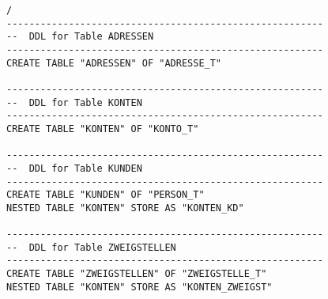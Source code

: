 \documentclass{scrartcl}
\begin{document}
\begin{lstlisting}
/
--------------------------------------------------------
--  DDL for Table ADRESSEN
--------------------------------------------------------
CREATE TABLE "ADRESSEN" OF "ADRESSE_T" 

--------------------------------------------------------
--  DDL for Table KONTEN
--------------------------------------------------------
CREATE TABLE "KONTEN" OF "KONTO_T" 

--------------------------------------------------------
--  DDL for Table KUNDEN
--------------------------------------------------------
CREATE TABLE "KUNDEN" OF "PERSON_T" 
NESTED TABLE "KONTEN" STORE AS "KONTEN_KD"

--------------------------------------------------------
--  DDL for Table ZWEIGSTELLEN
--------------------------------------------------------
CREATE TABLE "ZWEIGSTELLEN" OF "ZWEIGSTELLE_T" 
NESTED TABLE "KONTEN" STORE AS "KONTEN_ZWEIGST"
\end{lstlisting}
\end{document}
